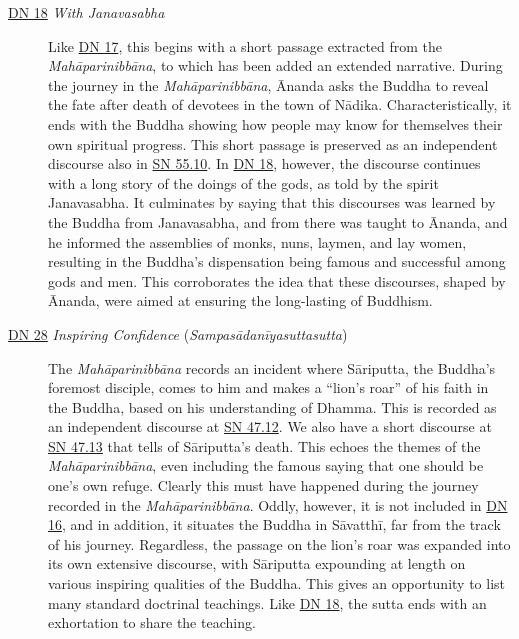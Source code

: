 \documentclass[12pt,openany]{book}%
\begin{document}
\begin{description}
\item[\href{https://suttacentral.net/dn18}{DN 18} \textit{With Janavasabha}] Like \href{https://suttacentral.net/dn17}{DN 17}, this begins with a short passage extracted from the \textit{\textsanskrit{Mahāparinibbāna}}, to which has been added an extended narrative. During the journey in the \textit{\textsanskrit{Mahāparinibbāna}}, Ānanda asks the Buddha to reveal the fate after death of devotees in the town of \textsanskrit{Nādika}. Characteristically, it ends with the Buddha showing how people may know for themselves their own spiritual progress. This short passage is preserved as an independent discourse also in \href{https://suttacentral.net/sn55.10}{SN 55.10}. In \href{https://suttacentral.net/dn18}{DN 18}, however, the discourse continues with a long story of the doings of the gods, as told by the spirit Janavasabha. It culminates by saying that this discourses was learned by the Buddha from Janavasabha, and from there was taught to Ānanda, and he informed the assemblies of monks, nuns, laymen, and lay women, resulting in the Buddha’s dispensation being famous and successful among gods and men. This corroborates the idea that these discourses, shaped by Ānanda, were aimed at ensuring the long-lasting of Buddhism.%
\item[\href{https://suttacentral.net/dn28}{DN 28} \textit{Inspiring Confidence} (\textit{\textsanskrit{Sampasādanīyasuttasutta}})] The \textit{\textsanskrit{Mahāparinibbāna}} records an incident where \textsanskrit{Sāriputta}, the Buddha’s foremost disciple, comes to him and makes a “lion’s roar” of his faith in the Buddha, based on his understanding of Dhamma. This is recorded as an independent discourse at \href{https://suttacentral.net/sn47.12}{SN 47.12}. We also have a short discourse at \href{https://suttacentral.net/sn47.13}{SN 47.13} that tells of \textsanskrit{Sāriputta}’s death. This echoes the themes of the \textit{\textsanskrit{Mahāparinibbāna}}, even including the famous saying that one should be one’s own refuge. Clearly this must have happened during the journey recorded in the \textit{\textsanskrit{Mahāparinibbāna}}. Oddly, however, it is not included in \href{https://suttacentral.net/dn16}{DN 16}, and in addition, it situates the Buddha in \textsanskrit{Sāvatthī}, far from the track of his journey. Regardless, the passage on the lion’s roar was expanded into its own extensive discourse, with \textsanskrit{Sāriputta} expounding at length on various inspiring qualities of the Buddha. This gives an opportunity to list many standard doctrinal teachings. Like \href{https://suttacentral.net/dn18}{DN 18}, the sutta ends with an exhortation to share the teaching.%
\end{description}
\end{document}
